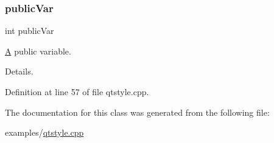 \mbox{\label{class_q_tstyle___test_a292887ac25652b1d8448430f583378c3}} 
\subsubsection{\texorpdfstring{public\+Var}{publicVar}}
{\footnotesize\ttfamily int public\+Var}



\hyperlink{class_a}{A} public variable. 

Details. 

Definition at line 57 of file qtstyle.\+cpp.



The documentation for this class was generated from the following file\+:\begin{DoxyCompactItemize}
\item 
examples/\hyperlink{qtstyle_8cpp}{qtstyle.\+cpp}\end{DoxyCompactItemize}
